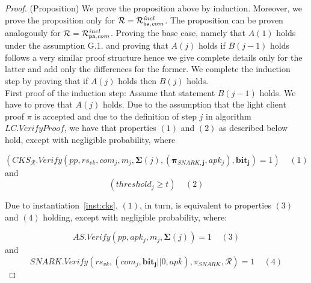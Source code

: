 \begin{proof}(Proposition) We prove the proposition above by induction. Moreover, we prove the proposition 
only for $ \mathcal{R} = \mathcal{R}^{\mathit{incl}}_{\mathsf{ba},\mathit{com}}$. The proposition can be proven analogously for $\mathcal{R} = \mathcal{R}^{\mathit{incl}}_{\mathsf{pa},\mathit{com}}$. 
Proving the base case, namely that $A(1)$ holds under the assumption G.1. and proving that $A(j)$ holds 
if $B(j-1)$ holds follows a very similar proof structure hence we give complete details only for the latter and add 
only the differences for the former. We complete the induction step by proving that if $A(j)$ holds then $B(j)$ holds. \\

\noindent First proof of the induction step: Assume that statement $B(j-1)$ holds. We have to prove that $A(j)$ holds. 
Due to the assumption that the light client proof $\pi$ is accepted and due to 
the definition of step $j$ in algorithm $\mathit{LC.VerifyProof}$, we have that properties 
$(1)$ and $(2)$ as described below hold, except with negligible probability, where

$$(\mathit{CKS}_{\mathcal{R}}.\mathit{Verify}(\mathit{pp},  \mathit{rs_{\mathit{vk}}}, \mathit{com_j}, m_j, 
 \mathbf{\Sigma}(j), (\mathbf{\pi_{\mathit{SNARK},j}}, \mathit{apk_j}), 
\mathbf{bit_j}) = 1) \ \ \ \ \  (1)$$ 
and
$$(\mathit{threshold_j} \geq t) \ \ \ \ \  (2)$$

\noindent Due to instantiation~\ref{inst:cks}, $(1)$, in turn, is equivalent to properties $(3)$ and $(4)$ holding, 
except with negligible probability, where:

$$ \mathit{AS.Verify}(\mathit{pp}, \mathit{apk_j}, m_j, \mathbf{\Sigma}(j)) = 1 \ \ \ \ \  (3)$$ 
and
$$\mathit{SNARK.Verify}(\mathit{rs}_{\mathit{vk}}, (\mathit{com_j}, \mathbf{bit_{j}} || 0, \mathit{apk}), \pi_{\mathit{SNARK}}, \mathcal{R}) = 1 \ \ \ \ \  (4)$$ 


\end{proof}
